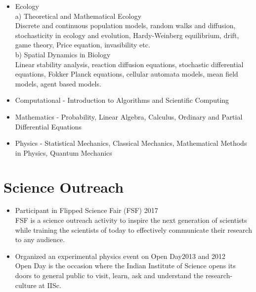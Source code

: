 \documentclass[11pt,a4paper,sans]{moderncv}        %
\begin{document}
\begin{itemize}
\setlength\itemsep{2.5pt}
\item Ecology  \\
a) Theoretical and Mathematical Ecology\\ {\footnotesize Discrete and continuous population models, random walks and diffusion, stochasticity in ecology and evolution, Hardy-Weinberg equilibrium, drift, game theory, Price equation, invasibility etc.} \\
b) Spatial Dynamics in Biology\\ {\footnotesize Linear stability analysis, reaction diffusion equations, stochastic differential equations, Fokker Planck equations, cellular automata models, mean field models, agent based models.}
\item Computational - Introduction to Algorithms and Scientific Computing 
\item Mathematics - Probability, Linear Algebra, Calculus,  Ordinary and Partial Differential Equations
\item Physics - Statistical Mechanics, Classical Mechanics, Mathematical Methods in Physics, Quantum Mechanics
\end{itemize}

\section{Science Outreach}
\begin{itemize}


\item Participant in Flipped Science Fair (FSF) \hfill 2017\\
{\footnotesize FSF is a science outreach activity to inspire the next generation of scientists while training the scientists of today to effectively communicate their research to any audience.}\\

\item Organized an experimental physics event on Open Day\hfill 2013 and 2012\\
{\footnotesize Open Day is the occasion where the Indian Institute of Science opens its doors to general public to visit, learn, ask and understand the research-culture at IISc.}

\end{itemize}
\end{document}
